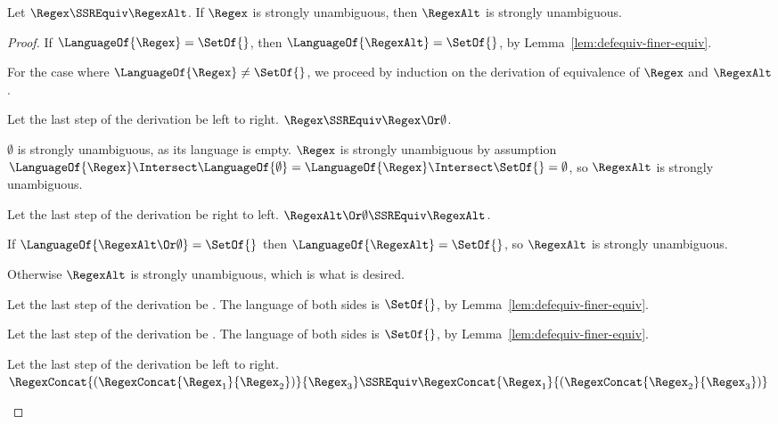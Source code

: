 \documentclass[sigplan,acmsmall]{acmart}
\begin{document}
\begin{lemma}
  Let $\Regex \SSREquiv \RegexAlt$.
  If $\Regex$ is strongly unambiguous, then $\RegexAlt$ is strongly unambiguous.
\end{lemma}
\begin{proof}
  If $\LanguageOf{\Regex} = \SetOf{}$, then $\LanguageOf{\RegexAlt} = \SetOf{}$,
  by Lemma~\ref{lem:defequiv-finer-equiv}.

  For the case where $\LanguageOf{\Regex} \neq \SetOf{}$, we proceed by
  induction on the derivation of equivalence of $\Regex$ and $\RegexAlt$.
  \begin{case}
    Let the last step of the derivation be \OrIdentityRule{} left to right.
    $\Regex \SSREquiv \Regex \Or \emptyset$.

    $\emptyset$ is strongly unambiguous, as its language is empty.
    $\Regex$ is strongly unambiguous by assumption
    $\LanguageOf{\Regex} \Intersect \LanguageOf{\emptyset} =
    \LanguageOf{\Regex} \Intersect \SetOf{} = \emptyset$, so $\RegexAlt$ is
    strongly unambiguous.
  \end{case}

  \begin{case}
    Let the last step of the derivation be \OrIdentityRule{} right to left.
    $\RegexAlt \Or \emptyset \SSREquiv \RegexAlt$.

    If $\LanguageOf{\RegexAlt \Or \emptyset} = \SetOf{}$ then
    $\LanguageOf{\RegexAlt} = \SetOf{}$, so $\RegexAlt$ is strongly unambiguous.

    Otherwise $\RegexAlt$ is strongly unambiguous, which is what is desired.
  \end{case}

  \begin{case}
    Let the last step of the derivation be \EmptyProjectionRightRule{}.
    The language of both sides is $\SetOf{}$, by
    Lemma~\ref{lem:defequiv-finer-equiv}.
  \end{case}

  \begin{case}
    Let the last step of the derivation be \EmptyProjectionLeftRule{}.
    The language of both sides is $\SetOf{}$, by
    Lemma~\ref{lem:defequiv-finer-equiv}.
  \end{case}
  
  \begin{case}
    Let the last step of the derivation be \ConcatAssocRule{} left to right.
    $\RegexConcat{(\RegexConcat{\Regex_1}{\Regex_2})}{\Regex_3}
    \SSREquiv
    \RegexConcat{\Regex_1}{(\RegexConcat{\Regex_2}{\Regex_3})}$


\end{case}
\end{proof}
\end{document}
